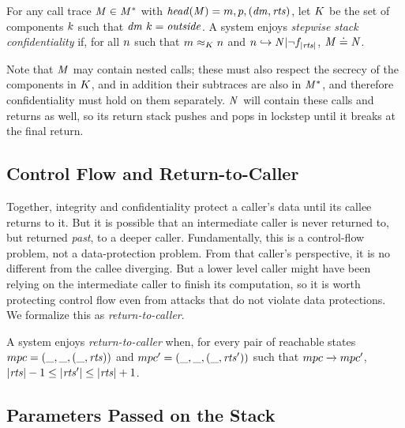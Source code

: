 \documentclass[acmsmall,review,anonymous]{acmart}\settopmatter{printfolios=true,printccs=false,printacmref=false}
\begin{document}
For any call trace \(\mathit{M} \in \mathit{M}^*\) with \(\mathit{head}(\mathit{M}) = m,p,(\mathit{dm},\mathit{rts})\),
let \(K\) be the set of components \(k\) such that
\(\mathit{dm} ~ k = \mathit{outside}\).
A system enjoys \emph{stepwise stack confidentiality} if,
for all \(n\) such that \(m \approx_K n\) and
\(n \hookrightarrow \mathit{N} | \neg f_{|\mathit{rts}|}\),
\(\mathit{M} \doteq \mathit{N}\).

\vspace{\belowdisplayskip}

Note that \(\mathit{M}\) may contain nested calls; these must also respect the secrecy
of the components in \(K\), and in addition their subtraces are also in
\(\mathit{M}^*\), and therefore confidentiality must hold on them separately. \(\mathit{N}\)
will contain these calls and returns as well, so its return stack pushes and pops
in lockstep until it breaks at the final return.

\subsection{Control Flow and Return-to-Caller}
\label{sec:RTC}

Together, integrity and confidentiality protect a caller's data until its callee returns
to it. But it is possible that an intermediate caller is never returned to, but returned
{\em past}, to a deeper caller. Fundamentally, this is a control-flow problem, not a
data-protection problem. From that caller's perspective, it is no different from the
callee diverging. But a lower level caller might have been relying on the intermediate
caller to finish its computation, so it is worth protecting control flow even from
attacks that do not violate data protections. We formalize this as {\em return-to-caller}.


A system enjoys {\em return-to-caller} when, for every pair of reachable states
\(mpc = (\_,\_,(\_,\mathit{rts}))\) and
\(mpc' = (\_,\_,(\_,\mathit{rts}'))\) such that
\(mpc \xrightarrow{} mpc'\), \(|\mathit{rts}| - 1 \leq |\mathit{rts}'| \leq |\mathit{rts}| + 1\).

\subsection{Parameters Passed on the Stack}
\end{document}
